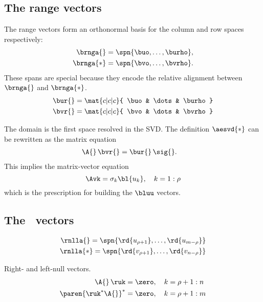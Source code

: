 \subsection{The range vectors}
The range vectors form an orthonormal basis for the column and row spaces respectively:
\begin{equation}
  \begin{split}
    \brnga{}  =  \spn{ \buo, \dots, \burho }, \\
    \brnga{*} =  \spn{ \bvo, \dots, \bvrho }.
  \end{split}
\end{equation}
These spans are special because they encode the relative alignment between $\brnga{}$ and $\brnga{*}$.
\begin{equation}
  \begin{split}
    \bur{} &= \mat{c|c|c}{
      \buo & \dots & \burho
    } \\
    \bvr{} &= \mat{c|c|c}{
      \bvo & \dots & \bvrho
    }
  \end{split}
\end{equation}


The domain is the first space resolved in the SVD. The definition $\aesvd{*}$ can be rewritten as the matrix equation
\begin{equation}
  \begin{split}
    \A{}\,\bvr{} &= \bur{}\,\sig{}.
  \end{split}
\end{equation}
This implies the matrix-vector equation
\begin{equation}
  \Avk = \sigma_{k} {\bl{ u_{k} }}, \quad k=1:\rho
\end{equation}
which is the prescription for building the $\bluu$ vectors.


\subsection{The \ns \ vectors}
\begin{equation}
  \begin{split}
    \rnlla{}  =  \spn{ {\rd{ u_{\rho+1} }}, \dots, {\rd{ u_{m-\rho} }} } \\
    \rnlla{*} =  \spn{ {\rd{ v_{\rho+1} }}, \dots, {\rd{ v_{n-\rho} }} }
  \end{split}
\end{equation}

Right- and left-null vectors.
\begin{equation}
  \begin{split}
    \A{}\, \ruk &= \zero, \quad k=\rho+1:n \\
    \paren{ \ruk^{*} \A{} }^{*} &= \zero, \quad k=\rho+1:m \\
  \end{split}
\end{equation}


